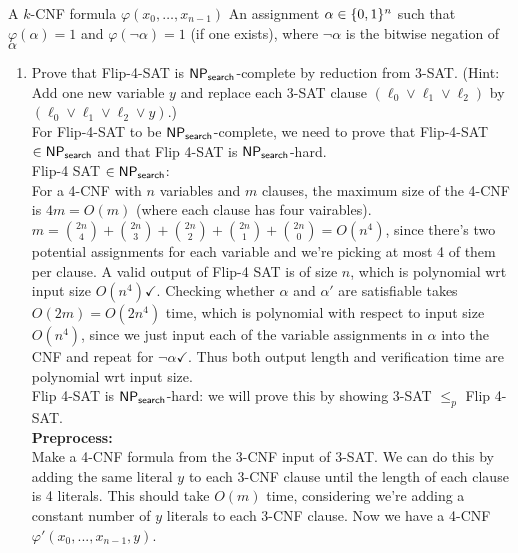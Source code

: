 \documentclass[11pt]{article}
\begin{document}
\begin{enumerate}
        {A $k$-CNF formula $\varphi(x_0,\ldots,x_{n-1})$}
        {An assignment $\alpha\in\{0,1\}^n$ such that $\varphi(\alpha)=1$ and $\varphi(\neg \alpha)=1$ (if one exists), where $\neg \alpha$ is the bitwise negation of $\alpha$}
        \begin{enumerate}
        \item Prove that Flip-4-SAT is $\mathsf{NP_{search}}$-complete by reduction from 3-SAT.  (Hint: Add one new variable $y$ and replace each 3-SAT clause $(\ell_0 \vee \ell_1 \vee \ell_2)$ by $(\ell_0 \vee \ell_1 \vee \ell_2 \vee y)$.) \\

        For Flip-4-SAT to be $\mathsf{NP_{search}}$-complete, we need to prove that Flip-4-SAT $\in \mathsf{NP_{search}}$ and that Flip 4-SAT is $\mathsf{NP_{search}}$-hard. \\

        Flip-4 SAT $\in \mathsf{NP_{search}}$: \\

        For a 4-CNF with $n$ variables and $m$ clauses, the maximum size of the 4-CNF is $4m = O(m)$ (where each clause has four vairables). $m = \binom{2n}{4} + \binom{2n}{3} + \binom{2n}{2} + \binom{2n}{1} + \binom{2n}{0}= O(n^4)$, since there's two potential assignments for each variable and we're picking at most 4 of them per clause. A valid output of Flip-4 SAT is of size $n$, which is polynomial wrt input size $O(n^{4}) \checkmark$. Checking whether $\alpha$ and $\alpha'$ are satisfiable takes $O(2m) = O(2n^4)$ time, which is polynomial with respect to input size $O(n^4)$, since we just input each of the variable assignments in $\alpha$ into the CNF and repeat for $\neg \alpha \checkmark$. Thus both output length and verification time are polynomial wrt input size. \\

        Flip 4-SAT is $\mathsf{NP_{search}}$-hard: we will prove this by showing 3-SAT $\leq_p$ Flip 4-SAT. \\

        \textbf{Preprocess:} \\

        Make a 4-CNF formula from the 3-CNF input of 3-SAT. We can do this by adding the same literal $y$ to each 3-CNF clause until the length of each clause is 4 literals. This should take $O(m)$ time, considering we're adding a constant number of $y$ literals to each 3-CNF clause. Now we have a 4-CNF $\varphi'(x_0,...,x_{n-1},y)$. \\


\end{enumerate}
\end{enumerate}
\end{document}
